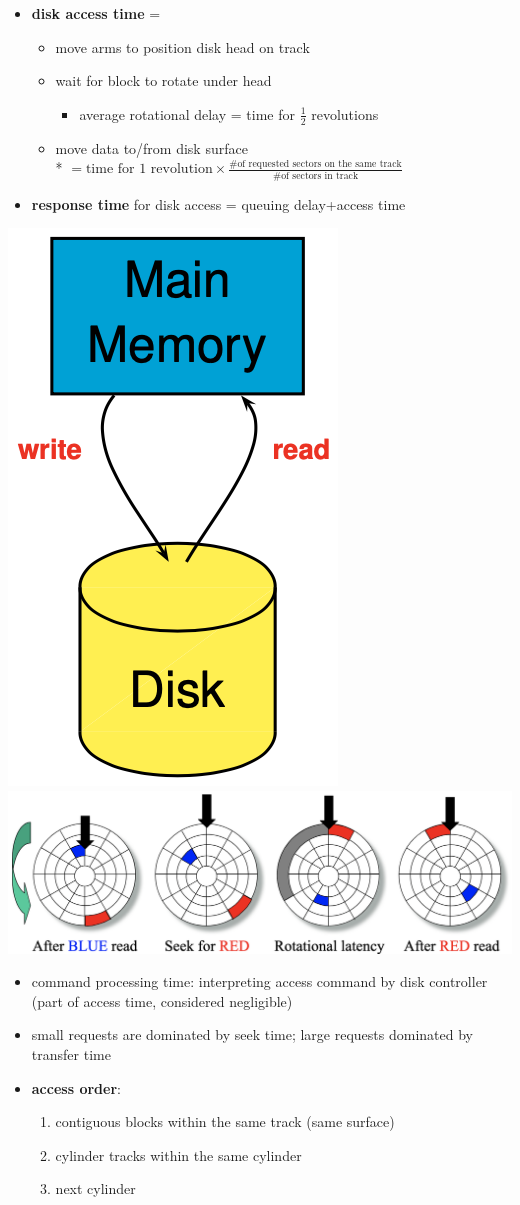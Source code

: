 \documentclass[10pt, landscape]{article}
\begin{document}
\begin{multicols*}{4}
  \begin{itemize}
    \item \textbf{disk access time} =
      \begin{itemize}
        \item {} move arms to position disk head on track 
        \item {} wait for block to rotate under head
          \begin{itemize}
            \item average rotational delay = time for $\frac{1}{2}$ revolutions
          \end{itemize}
        \item {} move data to/from disk surface
          \\* $= \text{time for 1 revolution} \times \frac{ \text{\# of requested sectors on the same track} }{ \text{\# of sectors in track} } $
      \end{itemize}
    \item \textbf{response time} for disk access = queuing delay+access time
  \end{itemize}

  \includegraphics[width=0.15\linewidth]{cs3223-dbms-storage.png} 
  \includegraphics[width=0.8\linewidth]{cs3223-access-time-example.png} 

  \begin{itemize}
    \item command processing time: interpreting access command by disk controller (part of access time, considered negligible)
    \item small requests are dominated by seek time; large requests dominated by transfer time
    \item \textbf{access order}:
      \begin{enumerate}
        \item contiguous blocks within the same track (same surface)
        \item cylinder tracks within the same cylinder
        \item next cylinder
      \end{enumerate}
  \end{itemize}


\end{multicols*}
\end{document}
